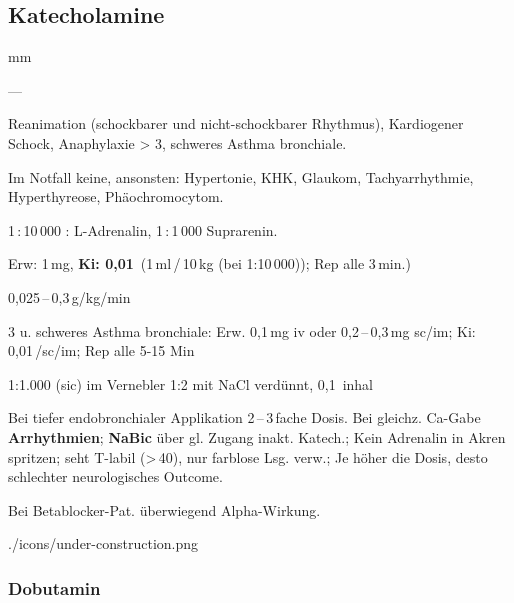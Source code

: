 %

\subsection{Katecholamine}

%

{
\begin{labeling}[:]{mm}
  \item[Beschreibung] --- 
  \item[In] Reanimation (schockbarer und nicht-schockbarer Rhythmus),
  Kardiogener Schock, Anaphylaxie > 3{\textdegree},  schweres Asthma bronchiale.
  \item[KI:]Im Notfall keine, ansonsten: 
  Hypertonie, KHK, Glaukom, Tachyarrhythmie, Hyperthyreose,
  Phäochromocytom.
  \item[Präparate] 1\,:\,10\,000 : L-Adrenalin, 1\,:\,1\,000 Suprarenin.
  \item[Rx]
  \begin{inparaitem}
  \item {} Erw: 1\,mg, \textbf{Ki: 0,01\,}
  (1\,ml\,/\,10\,kg (bei 1:10\,000)); Rep alle 3\,min.)
  \item {} 0,025\,--\,0,3\,{\textmu}g/kg/min
  \item {} 3{\textdegree} u. schweres Asthma bronchiale: Erw.
  0,1\,mg iv oder 0,2\,--\,0,3\,mg sc/im; Ki: 0,01\,/sc/im;
  Rep alle 5-15 Min
  \item {} 1:1.000 (sic) im Vernebler 1:2 mit NaCl
  verdünnt, 0,1\, inhal
  \end{inparaitem}
  \item[Anm.] Bei tiefer endobronchialer Applikation 2\,--\,3\,fache Dosis. Bei
  gleichz. Ca-Gabe \textbf{Arrhythmien}; \textbf{NaBic} über gl. Zugang inakt. Katech.; Kein Adrenalin in Akren spritzen; seht
  T{\textdegree}-labil ({\textgreater}\,40{\textcelsius}), nur farblose
  Lsg. verw.; Je höher die Dosis, desto schlechter neurologisches Outcome.
  \item[Cave] Bei Betablocker-Pat. überwiegend Alpha-Wirkung.
\end{labeling}
}
{}
{./icons/under-construction.png}
{}
{}









\subsubsection{Dobutamin}

